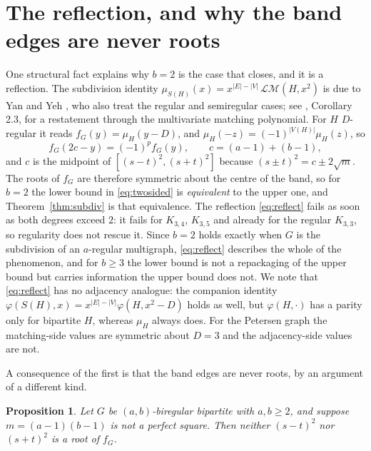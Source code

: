 \documentclass[11pt]{article}
\newtheorem{proposition}[theorem]{Proposition}
\theoremstyle{remark}
\begin{document}
\section{The reflection, and why the band edges are never roots}

One structural fact explains why $b=2$ is the case that closes, and it is a
reflection. The subdivision identity
$\mu_{S(H)}(x)=x^{|E|-|V|}\,\mathcal{LM}(H,x^2)$ is due to Yan and Yeh
\cite{YY}, who also treat the regular and semiregular cases; see
\cite{WWM}, Corollary 2.3, for a restatement through the multivariate matching
polynomial. For $H$ $D$-regular it reads $f_G(y)=\mu_H(y-D)$, and
$\mu_H(-z)=(-1)^{|V(H)|}\mu_H(z)$, so
\begin{equation}\label{eq:reflect}
f_G(2c-y)=(-1)^{p}f_G(y),\qquad c=(a-1)+(b-1),
\end{equation}
and $c$ is the midpoint of $[(s-t)^2,(s+t)^2]$ because $(s\pm t)^2=c\pm2\sqrt m$.
The roots of $f_G$ are therefore symmetric about the centre of the band, so for
$b=2$ the lower bound in \eqref{eq:twosided} is \emph{equivalent} to the upper
one, and Theorem~\ref{thm:subdiv} is that equivalence. The reflection
\eqref{eq:reflect} fails as soon as both degrees exceed $2$: it fails for
$K_{3,4}$, $K_{3,5}$ and already for the regular $K_{3,3}$, so regularity does
not rescue it. Since $b=2$ holds exactly when $G$ is the subdivision of an
$a$-regular multigraph, \eqref{eq:reflect} describes the whole of the
phenomenon, and for $b\ge3$ the lower bound is not a repackaging of the upper
bound but carries information the upper bound does not. We note that
\eqref{eq:reflect} has no adjacency analogue: the companion identity
$\varphi(S(H),x)=x^{|E|-|V|}\varphi(H,x^2-D)$ holds as well, but $\varphi(H,\cdot)$
has a parity only for bipartite $H$, whereas $\mu_H$ always does. For the
Petersen graph the matching-side values are symmetric about $D=3$ and the
adjacency-side values are not.

A consequence of the first is that the band edges are never roots, by an
argument of a different kind.

\begin{proposition}\label{prop:galois}
Let $G$ be $(a,b)$-biregular bipartite with $a,b\ge2$, and suppose
$m=(a-1)(b-1)$ is not a perfect square. Then neither $(s-t)^2$ nor $(s+t)^2$ is
a root of $f_G$.
\end{proposition}
\end{document}
